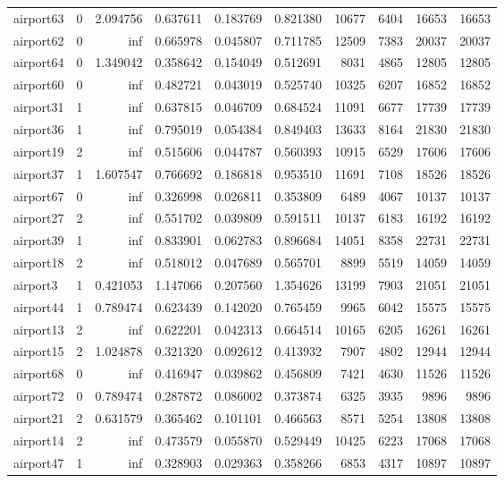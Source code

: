 \begin{longtable}{|l|r|r|r|r|r|r|r|r|r|}
airport63 & 0 & 2.094756 & 0.637611 & 0.183769 & 0.821380 & 10677 & 6404 & 16653 & 16653 \\
airport62 & 0 & inf & 0.665978 & 0.045807 & 0.711785 & 12509 & 7383 & 20037 & 20037 \\
airport64 & 0 & 1.349042 & 0.358642 & 0.154049 & 0.512691 & 8031 & 4865 & 12805 & 12805 \\
airport60 & 0 & inf & 0.482721 & 0.043019 & 0.525740 & 10325 & 6207 & 16852 & 16852 \\
airport31 & 1 & inf & 0.637815 & 0.046709 & 0.684524 & 11091 & 6677 & 17739 & 17739 \\
airport36 & 1 & inf & 0.795019 & 0.054384 & 0.849403 & 13633 & 8164 & 21830 & 21830 \\
airport19 & 2 & inf & 0.515606 & 0.044787 & 0.560393 & 10915 & 6529 & 17606 & 17606 \\
airport37 & 1 & 1.607547 & 0.766692 & 0.186818 & 0.953510 & 11691 & 7108 & 18526 & 18526 \\
airport67 & 0 & inf & 0.326998 & 0.026811 & 0.353809 & 6489 & 4067 & 10137 & 10137 \\
airport27 & 2 & inf & 0.551702 & 0.039809 & 0.591511 & 10137 & 6183 & 16192 & 16192 \\
airport39 & 1 & inf & 0.833901 & 0.062783 & 0.896684 & 14051 & 8358 & 22731 & 22731 \\
airport18 & 2 & inf & 0.518012 & 0.047689 & 0.565701 & 8899 & 5519 & 14059 & 14059 \\
airport3 & 1 & 0.421053 & 1.147066 & 0.207560 & 1.354626 & 13199 & 7903 & 21051 & 21051 \\
airport44 & 1 & 0.789474 & 0.623439 & 0.142020 & 0.765459 & 9965 & 6042 & 15575 & 15575 \\
airport13 & 2 & inf & 0.622201 & 0.042313 & 0.664514 & 10165 & 6205 & 16261 & 16261 \\
airport15 & 2 & 1.024878 & 0.321320 & 0.092612 & 0.413932 & 7907 & 4802 & 12944 & 12944 \\
airport68 & 0 & inf & 0.416947 & 0.039862 & 0.456809 & 7421 & 4630 & 11526 & 11526 \\
airport72 & 0 & 0.789474 & 0.287872 & 0.086002 & 0.373874 & 6325 & 3935 & 9896 & 9896 \\
airport21 & 2 & 0.631579 & 0.365462 & 0.101101 & 0.466563 & 8571 & 5254 & 13808 & 13808 \\
airport14 & 2 & inf & 0.473579 & 0.055870 & 0.529449 & 10425 & 6223 & 17068 & 17068 \\
airport47 & 1 & inf & 0.328903 & 0.029363 & 0.358266 & 6853 & 4317 & 10897 & 10897 \\

\end{longtable}
